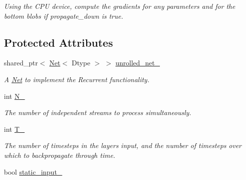 \begin{DoxyCompactItemize}
\begin{DoxyCompactList}\small\item\em Using the C\+PU device, compute the gradients for any parameters and for the bottom blobs if propagate\+\_\+down is true. \end{DoxyCompactList}\end{DoxyCompactItemize}
\subsection*{Protected Attributes}
\begin{DoxyCompactItemize}
\item 
shared\+\_\+ptr$<$ \hyperlink{classcaffe_1_1Net}{Net}$<$ Dtype $>$ $>$ \hyperlink{classcaffe_1_1RecurrentLayer_aa9b6cb6658e3bc8bfdf39441e751919a}{unrolled\+\_\+net\+\_\+}\hypertarget{classcaffe_1_1RecurrentLayer_aa9b6cb6658e3bc8bfdf39441e751919a}{}\label{classcaffe_1_1RecurrentLayer_aa9b6cb6658e3bc8bfdf39441e751919a}

\begin{DoxyCompactList}\small\item\em A \hyperlink{classcaffe_1_1Net}{Net} to implement the Recurrent functionality. \end{DoxyCompactList}\item 
int \hyperlink{classcaffe_1_1RecurrentLayer_a4bf3c3a87b2a740987aec46e40717907}{N\+\_\+}\hypertarget{classcaffe_1_1RecurrentLayer_a4bf3c3a87b2a740987aec46e40717907}{}\label{classcaffe_1_1RecurrentLayer_a4bf3c3a87b2a740987aec46e40717907}

\begin{DoxyCompactList}\small\item\em The number of independent streams to process simultaneously. \end{DoxyCompactList}\item 
int \hyperlink{classcaffe_1_1RecurrentLayer_a02f79bca0ccde7543ecf172b328c860f}{T\+\_\+}\hypertarget{classcaffe_1_1RecurrentLayer_a02f79bca0ccde7543ecf172b328c860f}{}\label{classcaffe_1_1RecurrentLayer_a02f79bca0ccde7543ecf172b328c860f}

\begin{DoxyCompactList}\small\item\em The number of timesteps in the layer\textquotesingle{}s input, and the number of timesteps over which to backpropagate through time. \end{DoxyCompactList}\item 
bool \hyperlink{classcaffe_1_1RecurrentLayer_a7da45d2f90a99fe6e4250ffa6a533d97}{static\+\_\+input\+\_\+}\hypertarget{classcaffe_1_1RecurrentLayer_a7da45d2f90a99fe6e4250ffa6a533d97}{}\label{classcaffe_1_1RecurrentLayer_a7da45d2f90a99fe6e4250ffa6a533d97}


\end{DoxyCompactItemize}
